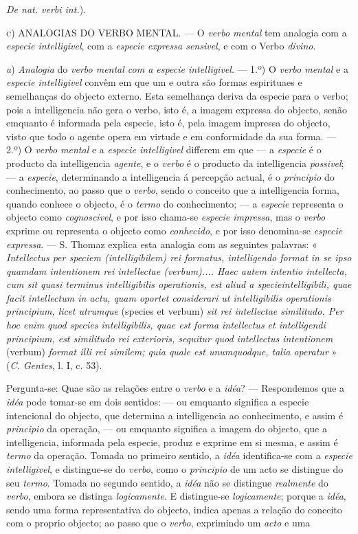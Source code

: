 \emph{De nat. verbi int.}).\par \textsc{c)} \textsc{ANALOGIAS} DO VERBO MENTAL. --- O \emph{verbo mental} tem analogia com a \emph{especie intelligivel}, com a \emph{especie expressa sensivel}, e com o Verbo \emph{divino}.\par \emph{a}) \emph{Analogia} do \emph{verbo mental com a especie intelligivel}. --- 1.º) O \emph{verbo mental} e a \emph{especie intelligivel} convêm em que um e outra são formas espirituaes e semelhanças do objecto externo. Esta semelhança deriva da especie para o verbo; pois a intelligencia não gera o verbo, isto é, a imagem expressa do objecto, senão emquanto é informada pela especie, isto é, pela imagem impressa do objecto, visto que todo o agente opera em virtude e em conformidade da sua forma. --- 2.º) O \emph{verbo mental} e a \emph{especie intelligivel} differem em que --- a \emph{especie} é o producto da intelligencia \emph{agente}, e o \emph{verbo} é o producto da intelligencia \emph{possivel}; --- a \emph{especie}, determinando a intelligencia á percepção actual, é o \emph{principio} do conhecimento, ao passo que o \emph{verbo}, sendo o conceito que a intelligencia forma, quando conhece o objecto, é o \emph{termo} do conhecimento; --- a \emph{especie} representa o objecto como \emph{cognoscivel}, e por isso chama-se \emph{especie impressa}, mas o \emph{verbo} exprime ou representa o objecto como \emph{conhecido}, e por isso denomina-se \emph{especie expressa}. --- S. Thomaz explica esta analogia com as seguintes palavras: « \emph{Intellectus per speciem (intelligibilem) rei formatus, intelligendo format in se ipso quamdam intentionem rei intellectae (verbum).... Haec autem intentio intellecta, cum sit quasi terminus intelligibilis operationis, est aliud a specie}\emph{intelligibili, quae facit intellectum in actu, quam oportet considerari ut intelligibilis operationis principium, licet utrumque} (species et verbum) \emph{sit rei intellectae similitudo. Per hoc enim quod species intelligibilis, quae est forma intellectus et intelligendi principium, est similitudo rei exterioris, sequitur quod intellectus intentionem} (verbum) \emph{format illi rei similem; quia quale est unumquodque, talia operatur} » (\emph{C. Gentes}, l. I, c. 53).\par Pergunta-se: Quae são as relações entre o \emph{verbo} e a \emph{idéa}? --- Respondemos que a \emph{idéa} pode tomar-se em dois sentidos: --- ou emquanto significa a especie intencional do objecto, que determina a intelligencia ao conhecimento, e assim é \emph{principio} da operação, --- ou emquanto significa a imagem do objecto, que a intelligencia, informada pela especie, produz e exprime em si mesma, e assim é \emph{termo} da operação. Tomada no primeiro sentido, a \emph{idéa} identifica-se com a \emph{especie intelligivel}, e distingue-se do \emph{verbo}, como o \emph{principio} de um acto se distingue do seu \emph{termo}. Tomada no segundo sentido, a \emph{idéa} não se distingue \emph{realmente} do \emph{verbo}, embora se distinga \emph{logicamente}. E distingue-se \emph{logicamente}; porque a \emph{idéa}, sendo uma forma representativa do objecto, indica apenas a relação do conceito com o proprio objecto; ao passo que o \emph{verbo}, exprimindo um \emph{acto} e uma 